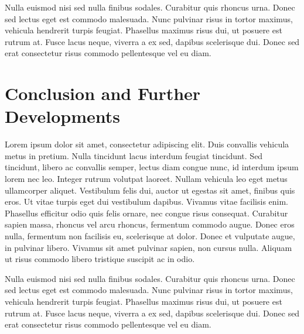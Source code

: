 \documentclass[twocolumn,a4paper,10pt]{article}
\begin{document}
Nulla euismod nisi sed nulla finibus sodales. Curabitur quis rhoncus urna. Donec sed lectus eget est commodo malesuada. Nunc pulvinar risus in tortor maximus, vehicula hendrerit turpis feugiat. Phasellus maximus risus dui, ut posuere est rutrum at. Fusce lacus neque, viverra a ex sed, dapibus scelerisque dui. Donec sed erat consectetur risus commodo pellentesque vel eu diam. 


\section{Conclusion and Further Developments}
\label{sec:Conclusion}

Lorem ipsum dolor sit amet, consectetur adipiscing elit. Duis convallis vehicula metus in pretium. Nulla tincidunt lacus interdum feugiat tincidunt. Sed tincidunt, libero ac convallis semper, lectus diam congue nunc, id interdum ipsum lorem nec leo. Integer rutrum volutpat laoreet. Nullam vehicula leo eget metus ullamcorper aliquet. Vestibulum felis dui, auctor ut egestas sit amet, finibus quis eros. Ut vitae turpis eget dui vestibulum dapibus. Vivamus vitae facilisis enim. Phasellus efficitur odio quis felis ornare, nec congue risus consequat. Curabitur sapien massa, rhoncus vel arcu rhoncus, fermentum commodo augue. Donec eros nulla, fermentum non facilisis eu, scelerisque at dolor. Donec et vulputate augue, in pulvinar libero. Vivamus sit amet pulvinar sapien, non cursus nulla. Aliquam ut risus commodo libero tristique suscipit ac in odio.

Nulla euismod nisi sed nulla finibus sodales. Curabitur quis rhoncus urna. Donec sed lectus eget est commodo malesuada. Nunc pulvinar risus in tortor maximus, vehicula hendrerit turpis feugiat. Phasellus maximus risus dui, ut posuere est rutrum at. Fusce lacus neque, viverra a ex sed, dapibus scelerisque dui. Donec sed erat consectetur risus commodo pellentesque vel eu diam. 

\end{document}

